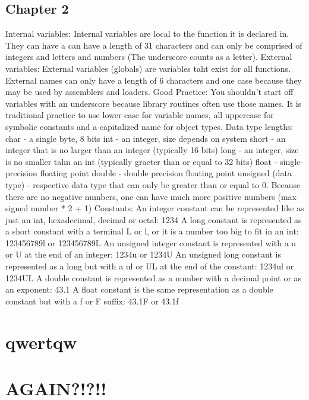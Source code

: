 \documentclass[11pt,letterpaper]{article}
\begin{document}
\subsection{Chapter 2}
Internal variables:\newline
Internal variables are local to the function it is declared in. They can have a can have a length of 31 characters and can only be comprised of integers and letters and numbers (The underscore counts as a letter). 
External variables:\newline
External variables (globals) are variables taht exist for all functions. External names can only have a length of 6 characters and one case because they may be used by assemblers and loaders.
Good Practice:\newline
You shouldn't start off variables with an underscore because library routines often use those names. It is traditional practice to use lower case for variable names, all uppercase for symbolic constants and a capitalized name for object types. 
Data type lengths:\newline
char - a single byte, 8 bits
int - an integer, size depends on system
short - an integer that is no larger than an integer (typically 16 bits)
long - an integer, size is no smaller tahn an int (typically graeter than or equal to 32 bits)
float - single-precision floating point
double - double precision floating point
unsigned (data type) - respective data type that can only be greater than or equal to 0. Because there are no negative numbers, one can have much more positive numbers (max signed number * 2 + 1) 
Constants:\newline
An integer constant can be represented like as just an int, hexadecimal, decimal or octal: 1234
A long constant is represented as a short constant with a terminal L or l, or it is a number too big to fit in an int: 123456789l or 123456789L
An unsigned integer constant is represented with a u or U at the end of an integer: 1234u or 1234U
An unsigned long constant is represented as a long but with a ul or UL at the end of the constant: 1234ul or 1234UL
A double constant is represented as a number with a decimal point or as an exponent: 43.1
A float constant is the same representation as a double constant but with a f or F suffix: 43.1F or 43.1f



\newpage

\section{qwertqw}

\section{AGAIN?!?!!}

\end{document}
